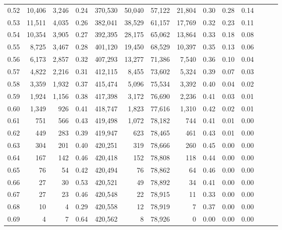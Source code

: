 \begin{tabular}{rrrrrrrrrrrrrr}
0.52 &  10,406 &  3,246 &  0.24 &  370,530 &   50,040 &  57,122 &  21,804 &  0.30 &  0.28 &      0.14 \\
0.53 &  11,511 &  4,035 &  0.26 &  382,041 &   38,529 &  61,157 &  17,769 &  0.32 &  0.23 &      0.11 \\
0.54 &  10,354 &  3,905 &  0.27 &  392,395 &   28,175 &  65,062 &  13,864 &  0.33 &  0.18 &      0.08 \\
0.55 &   8,725 &  3,467 &  0.28 &  401,120 &   19,450 &  68,529 &  10,397 &  0.35 &  0.13 &      0.06 \\
0.56 &   6,173 &  2,857 &  0.32 &  407,293 &   13,277 &  71,386 &   7,540 &  0.36 &  0.10 &      0.04 \\
0.57 &   4,822 &  2,216 &  0.31 &  412,115 &    8,455 &  73,602 &   5,324 &  0.39 &  0.07 &      0.03 \\
0.58 &   3,359 &  1,932 &  0.37 &  415,474 &    5,096 &  75,534 &   3,392 &  0.40 &  0.04 &      0.02 \\
0.59 &   1,924 &  1,156 &  0.38 &  417,398 &    3,172 &  76,690 &   2,236 &  0.41 &  0.03 &      0.01 \\
0.60 &   1,349 &    926 &  0.41 &  418,747 &    1,823 &  77,616 &   1,310 &  0.42 &  0.02 &      0.01 \\
0.61 &     751 &    566 &  0.43 &  419,498 &    1,072 &  78,182 &     744 &  0.41 &  0.01 &      0.00 \\
0.62 &     449 &    283 &  0.39 &  419,947 &      623 &  78,465 &     461 &  0.43 &  0.01 &      0.00 \\
0.63 &     304 &    201 &  0.40 &  420,251 &      319 &  78,666 &     260 &  0.45 &  0.00 &      0.00 \\
0.64 &     167 &    142 &  0.46 &  420,418 &      152 &  78,808 &     118 &  0.44 &  0.00 &      0.00 \\
0.65 &      76 &     54 &  0.42 &  420,494 &       76 &  78,862 &      64 &  0.46 &  0.00 &      0.00 \\
0.66 &      27 &     30 &  0.53 &  420,521 &       49 &  78,892 &      34 &  0.41 &  0.00 &      0.00 \\
0.67 &      27 &     23 &  0.46 &  420,548 &       22 &  78,915 &      11 &  0.33 &  0.00 &      0.00 \\
0.68 &      10 &      4 &  0.29 &  420,558 &       12 &  78,919 &       7 &  0.37 &  0.00 &      0.00 \\
0.69 &       4 &      7 &  0.64 &  420,562 &        8 &  78,926 &       0 &  0.00 &  0.00 &      0.00 \\

\end{tabular}
